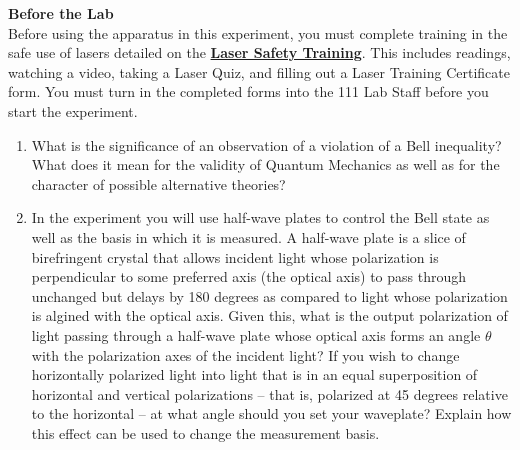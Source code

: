 \documentclass{../signatures}
\begin{document}
\maketitle

\names

\textbf{Before the Lab}
\\[12pt]
Before using the apparatus in this experiment, you must complete training in the safe use of lasers detailed on the \href{http://experimentationlab.berkeley.edu/lasersafety}{\textbf{Laser Safety Training}}. This includes readings, watching a video, taking a Laser Quiz, and filling out a Laser Training Certificate form. You must turn in the completed forms into the 111 Lab Staff before you start the experiment.
\\[32pt]
\prelab

\begin{enumerate}

    \item What is the significance of an observation of a violation of a Bell inequality? What does it mean for the validity of Quantum Mechanics as well as for the character of possible alternative theories?
    
      \item In the experiment you will use half-wave plates to control the Bell state as well as the basis in which it is measured. A half-wave plate is a slice of birefringent crystal that allows incident light whose polarization is perpendicular to some preferred axis (the optical axis) to pass through unchanged but delays by 180 degrees as compared to light whose polarization is algined with the optical axis. Given this, what is the output polarization of light passing through a half-wave plate whose optical axis forms an angle $\theta$ with the polarization axes of the incident light? If you wish to change horizontally polarized light into light that is in an equal superposition of horizontal and vertical polarizations -- that is, polarized at 45 degrees relative to the horizontal -- at what angle should you set your waveplate? Explain how this effect can be used
    to change the measurement basis.
    

\end{enumerate}
\end{document}
